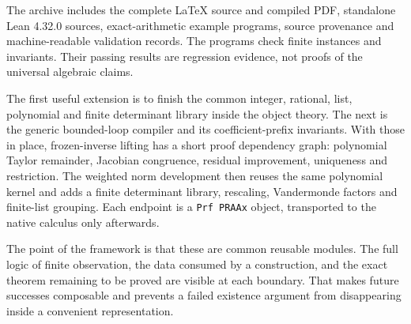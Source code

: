 The archive includes the complete LaTeX source and compiled PDF,
standalone Lean 4.32.0 sources, exact-arithmetic example programs, source
provenance and machine-readable validation records. The programs check
finite instances and invariants. Their passing results are regression
evidence, not proofs of the universal algebraic claims.

The first useful extension is to finish the common integer, rational,
list, polynomial and finite determinant library inside the object theory.
The next is the generic bounded-loop compiler and its coefficient-prefix
invariants. With those in place, frozen-inverse lifting has a short proof
dependency graph: polynomial Taylor remainder, Jacobian congruence,
residual improvement, uniqueness and restriction. The weighted norm
development then reuses the same polynomial kernel and adds a finite
determinant library, rescaling, Vandermonde factors and finite-list
grouping. Each endpoint is a \texttt{Prf PRAAx} object, transported to the
native calculus only afterwards.

The point of the framework is that these are common reusable modules.
The full logic of finite observation, the data consumed by a construction,
and the exact theorem remaining to be proved are visible at each boundary.
That makes future successes composable and prevents a failed existence
argument from disappearing inside a convenient representation.
